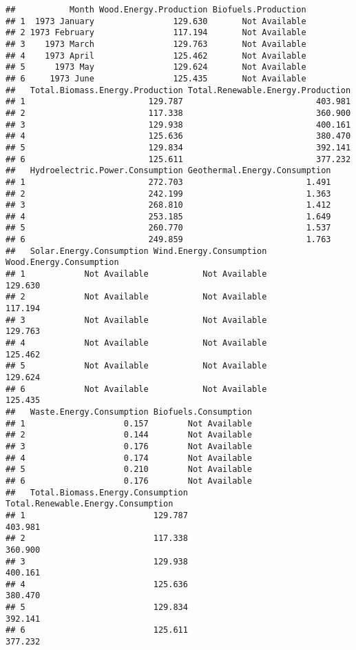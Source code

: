 \documentclass[
]{article}
\begin{document}
\begin{verbatim}
##           Month Wood.Energy.Production Biofuels.Production
## 1  1973 January                129.630       Not Available
## 2 1973 February                117.194       Not Available
## 3    1973 March                129.763       Not Available
## 4    1973 April                125.462       Not Available
## 5      1973 May                129.624       Not Available
## 6     1973 June                125.435       Not Available
##   Total.Biomass.Energy.Production Total.Renewable.Energy.Production
## 1                         129.787                           403.981
## 2                         117.338                           360.900
## 3                         129.938                           400.161
## 4                         125.636                           380.470
## 5                         129.834                           392.141
## 6                         125.611                           377.232
##   Hydroelectric.Power.Consumption Geothermal.Energy.Consumption
## 1                         272.703                         1.491
## 2                         242.199                         1.363
## 3                         268.810                         1.412
## 4                         253.185                         1.649
## 5                         260.770                         1.537
## 6                         249.859                         1.763
##   Solar.Energy.Consumption Wind.Energy.Consumption Wood.Energy.Consumption
## 1            Not Available           Not Available                 129.630
## 2            Not Available           Not Available                 117.194
## 3            Not Available           Not Available                 129.763
## 4            Not Available           Not Available                 125.462
## 5            Not Available           Not Available                 129.624
## 6            Not Available           Not Available                 125.435
##   Waste.Energy.Consumption Biofuels.Consumption
## 1                    0.157        Not Available
## 2                    0.144        Not Available
## 3                    0.176        Not Available
## 4                    0.174        Not Available
## 5                    0.210        Not Available
## 6                    0.176        Not Available
##   Total.Biomass.Energy.Consumption Total.Renewable.Energy.Consumption
## 1                          129.787                            403.981
## 2                          117.338                            360.900
## 3                          129.938                            400.161
## 4                          125.636                            380.470
## 5                          129.834                            392.141
## 6                          125.611                            377.232
\end{verbatim}
\end{document}
